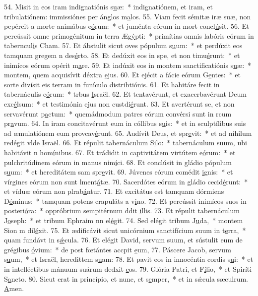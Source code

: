 54. Misit in eos iram indignatiónis s\uline{u}æ:~* indignatiónem, et iram, et tribulatiónem: immissiónes per ánglos m\uline{a}los.
55. Viam fecit sémitæ iræ suæ, non pepércit a morte animábus e\uline{ó}rum:~* et juménta eórum in mort concl\uline{ú}sit.
56. Et percússit omne primogénitum in terra Æg\uline{ý}pti:~* primítias omnis labóris eórum in taberncul\uline{i}s Cham.
57. Et ábstulit sicut oves pópulum s\uline{u}um:~* et perdúxit eos tamquam gregem n des\uline{é}rto.
58. Et dedúxit eos in spe, et non timu\uline{é}runt:~* et inimícos eórum opérit m\uline{a}re.
59. Et indúxit eos in montem sanctificatiónis s\uline{u}æ:~* montem, quem acquisívit déxtra \uline{e}jus.
60. Et ejécit a fácie eórum G\uline{e}ntes:~* et sorte divísit eis terram in funículo distribti\uline{ó}nis.
61. Et habitáre fecit in tabernáculis e\uline{ó}rum:~* trbus \uline{I}sraël.
62. Et tentavérunt, et exacerbavérunt Deum exc\uline{é}lsum:~* et testimónia ejus non custdi\uline{é}runt.
63. Et avertérunt se, et non servavérunt p\uline{a}ctum:~* quemádmodum patres eórum convérsi sunt in rcum pr\uline{a}vum.
64. In iram concitavérunt eum in cóllibus s\uline{u}is:~* et in sculptílibus suis ad æmulatiónem eum provcav\uline{é}runt.
65. Audívit Deus, et spr\uline{e}vit:~* et ad níhilum redégit vlde \uline{I}sraël.
66. Et répulit tabernáculum S\uline{i}lo:~* tabernáculum suum, ubi habitávit n hom\uline{í}nibus.
67. Et trádidit in captivitátem virtútem e\uline{ó}rum:~* et pulchritúdinem eórum in manus nim\uline{í}ci.
68. Et conclúsit in gládio pópulum s\uline{u}um:~* et hereditátem sam spr\uline{e}vit.
69. Júvenes eórum comédit \uline{i}gnis:~* et vírgines eórum non sunt lment\uline{á}tæ.
70. Sacerdótes eórum in gládio cecid\uline{é}runt:~* et víduæ eórum non plrab\uline{á}ntur.
71. Et excitátus est tamquam dórmiens D\uline{ó}minus:~* tamquam potens crapuláts a v\uline{i}no.
72. Et percússit inimícos suos in posteri\uline{ó}ra:~* oppróbrium sempitérnum ddit \uline{i}llis.
73. Et répulit tabernáculum J\uline{o}seph:~* et tribum Ephraim nn el\uline{é}git.
74. Sed elégit tribum J\uline{u}da,~* montem Sion m dil\uline{é}xit.
75. Et ædificávit sicut unicórnium sanctifícium suum in t\uline{e}rra,~* quam fundávt in s\uline{ǽ}cula.
76. Et elégit David, servum suum, et sústulit eum de grégibus \uline{ó}vium:~* de post fœtántes accpit \uline{e}um,
77. Páscere Jacob, servum s\uline{u}um,~* et Israël, heredittem s\uline{u}am:
78. Et pavit eos in innocéntia cordis s\uline{u}i:~* et in intelléctibus mánuum suárum dedxit \uline{e}os.
79. Glória Patri, et F\uline{í}lio,~* et Spiríti S\uline{a}ncto.
80. Sicut erat in princípio, et nunc, et s\uline{e}mper,~* et in sǽcula sæculrum. \uline{A}men.
